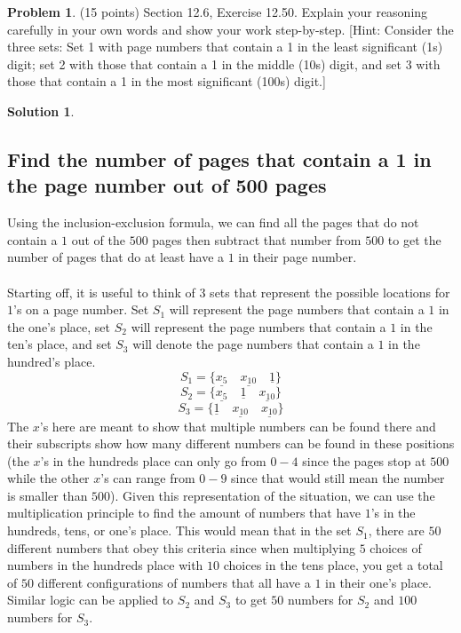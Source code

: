\documentclass{article}
\theoremstyle{definition}
\newtheorem{problem}{Problem}
\newtheorem*{solution}{Solution}
\begin{document}
\newpage
\begin{problem} (15 points) Section 12.6, Exercise 12.50.  Explain your reasoning
carefully in your own words and show your work step-by-step.
[Hint: Consider the three sets: Set 1 with page numbers that contain a 1 in the least 
significant (1s) digit; set 2 with those that contain a 1 in the middle (10s) digit, and 
set 3 with those that contain a 1 in the most significant (100s) digit.]
\end{problem}
\begin{solution}
\hspace{1cm}
\subsection*{Find the number of pages that contain a 1 in the page number out of 500 pages}
Using the inclusion-exclusion formula, we can find all the pages that do not contain a $1$ out of the $500$ pages then subtract that number from $500$ to get the number of pages that do at least have a $1$ in their page number.\\\\
Starting off, it is useful to think of $3$ sets that represent the possible locations for $1$'s on a page number. Set $S_1$ will represent the page numbers that contain a $1$ in the one's place, set $S_2$ will represent the page numbers that contain a $1$ in the ten's place, and set $S_3$ will denote the page numbers that contain a $1$ in the hundred's place.
$$ S_1 = \{ \underline{x_{5}}\quad \underline{x_{10}} \quad \underline{1}\}$$
$$ S_2 = \{\underline{x_{5}} \quad \underline{1} \quad \underline{x_{10}} \}$$ 
$$ S_3 = \{\underline{1} \quad \underline{x_{10}} \quad \underline{x_{10}} \}$$
The $x$'s here are meant to show that multiple numbers can be found there and their subscripts show how many different numbers can be found in these positions (the $x$'s in the hundreds place can only go from $0-4$ since the pages stop at $500$ while the other $x$'s can range from $0-9$ since that would still mean the number is smaller than $500$). Given this representation of the situation, we can use the multiplication principle to find the amount of numbers that have $1$'s in the hundreds, tens, or one's place. This would mean that in the set $S_1$, there are $50$ different numbers that obey this criteria since when multiplying $5$ choices of numbers in the hundreds place with $10$ choices in the tens place, you get a total of $50$ different configurations of numbers that all have a $1$ in their one's place. Similar logic can be applied to $S_2$ and $S_3$ to get $50$ numbers for $S_2$ and $100$ numbers for $S_3$.\\\\

\end{solution}
\end{document}
